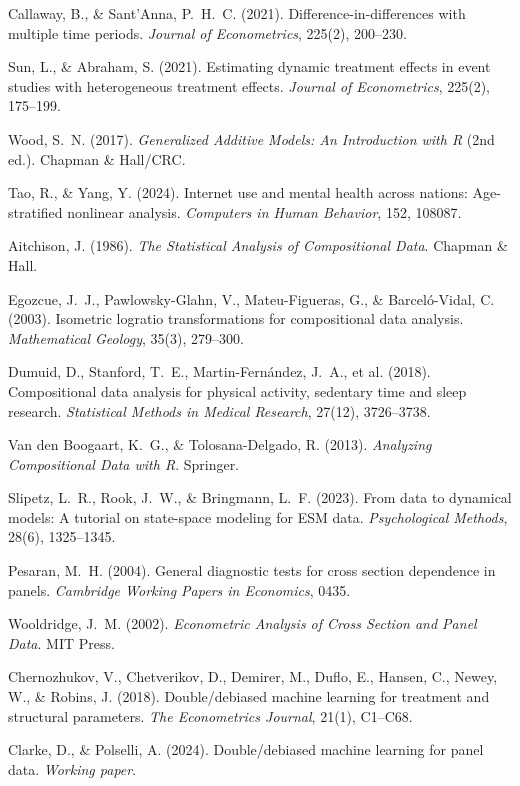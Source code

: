 \documentclass[a4paper,11pt,titlepage]{article}
\begin{document}
\begin{enumerate}[label={[\arabic*]}, leftmargin=2em, itemsep=2pt]
  \item Callaway, B., \& Sant'Anna, P.~H.~C. (2021). Difference-in-differences with multiple time periods. \textit{Journal of Econometrics}, 225(2), 200--230.
  \item Sun, L., \& Abraham, S. (2021). Estimating dynamic treatment effects in event studies with heterogeneous treatment effects. \textit{Journal of Econometrics}, 225(2), 175--199.
  \item Wood, S.~N. (2017). \textit{Generalized Additive Models: An Introduction with R} (2nd ed.). Chapman \& Hall/CRC.
  \item Tao, R., \& Yang, Y. (2024). Internet use and mental health across nations: Age-stratified nonlinear analysis. \textit{Computers in Human Behavior}, 152, 108087.
  \item Aitchison, J. (1986). \textit{The Statistical Analysis of Compositional Data}. Chapman \& Hall.
  \item Egozcue, J.~J., Pawlowsky-Glahn, V., Mateu-Figueras, G., \& Barcel\'o-Vidal, C. (2003). Isometric logratio transformations for compositional data analysis. \textit{Mathematical Geology}, 35(3), 279--300.
  \item Dumuid, D., Stanford, T.~E., Martin-Fern\'andez, J.~A., et al. (2018). Compositional data analysis for physical activity, sedentary time and sleep research. \textit{Statistical Methods in Medical Research}, 27(12), 3726--3738.
  \item Van den Boogaart, K.~G., \& Tolosana-Delgado, R. (2013). \textit{Analyzing Compositional Data with R}. Springer.
  \item Slipetz, L.~R., Rook, J.~W., \& Bringmann, L.~F. (2023). From data to dynamical models: A tutorial on state-space modeling for ESM data. \textit{Psychological Methods}, 28(6), 1325--1345.
  \item Pesaran, M.~H. (2004). General diagnostic tests for cross section dependence in panels. \textit{Cambridge Working Papers in Economics}, 0435.
  \item Wooldridge, J.~M. (2002). \textit{Econometric Analysis of Cross Section and Panel Data}. MIT Press.
  \item Chernozhukov, V., Chetverikov, D., Demirer, M., Duflo, E., Hansen, C., Newey, W., \& Robins, J. (2018). Double/debiased machine learning for treatment and structural parameters. \textit{The Econometrics Journal}, 21(1), C1--C68.
  \item Clarke, D., \& Polselli, A. (2024). Double/debiased machine learning for panel data. \textit{Working paper}.

\end{enumerate}
\end{document}
